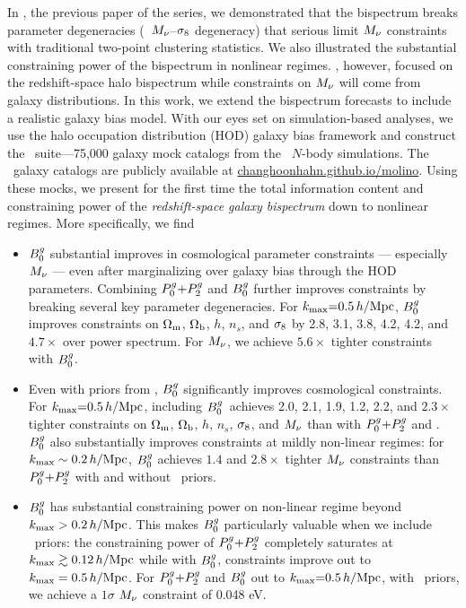 In \cite{hahn2020}, the previous paper of the series, we demonstrated that the 
bispectrum breaks parameter degeneracies (\eg~$M_\nu$--$\sigma_8$ degeneracy) that 
serious limit $M_\nu$ constraints with traditional two-point clustering statistics. 
We also illustrated the substantial constraining power of the bispectrum in nonlinear regimes.
\cite{hahn2020}, however, focused on the redshift-space halo bispectrum while 
constraints on $M_\nu$ will come from galaxy distributions. %
In this work, we extend the \cite{hahn2020} bispectrum forecasts to
include a realistic galaxy bias model. With our eyes set on
simulation-based analyses, we use the halo occupation distribution (HOD) galaxy
bias framework and construct the \molino~suite---75,000 galaxy mock catalogs from the \quij~$N$-body 
simulations. The \molino~galaxy catalogs are publicly available at 
\href{changhoonhahn.github.io/molino}{changhoonhahn.github.io/molino}.  
Using these mocks, we present for the first time the total information
content and constraining power of the {\em redshift-space galaxy bispectrum} 
down to nonlinear regimes. More specifically, we find
\begin{itemize}
    \item $B^g_0$ substantial improves in cosmological parameter constraints ---
        especially $M_\nu$ --- even after marginalizing over galaxy bias through
        the HOD parameters. Combining $P^g_0{+}P^g_2$ and $B^g_0$ further improves
        constraints by breaking several key parameter degeneracies. For 
        $k_{\rm max}{=}0.5\,h/\mathrm{Mpc}$, $B^g_0$ improves constraints on 
        $\Omega_{\rm m}$, $\Omega_{\rm b}$, $h$, $n_s$, and $\sigma_8$ by 2.8, 3.1, 3.8, 4.2, 4.2, and 
        $4.7{\times}$ over power spectrum. For $M_\nu$, we achieve $5.6\times$ 
        tighter constraints with $B^g_0$.

    \item Even with priors from \planck, $B^g_0$ significantly improves
        cosmological constraints. For $k_{\rm max}{=}0.5\,h/\mathrm{Mpc}$, including 
        $B^g_0$~achieves 2.0, 2.1, 1.9, 1.2, 2.2, and $2.3\times$ tighter
        constraints on $\Omega_{\rm m}$, $\Omega_{\rm b}$, $h$, $n_s$, $\sigma_8$, and $M_\nu$ than with $P^g_0{+}P^g_2$
        and \planck. $B^g_0$ also substantially improves constraints at mildly non-linear regimes:
        for $k_{\rm max}\sim0.2\,h/\mathrm{Mpc}$, $B^g_0$ achieves $1.4$ and $2.8\times$ tighter
        $M_\nu$ constraints than $P^g_0{+}P^g_2$ with and without \planck~priors. 

    \item $B^g_0$ has substantial constraining power on non-linear regime beyond
        $k_{\rm max} > 0.2\,h/\mathrm{Mpc}$. This makes $B^g_0$ particularly valuable when we include
        \planck~priors: the constraining power of $P^g_0{+}P^g_2$ completely saturates 
        at $k_{\rm max} \gtrsim 0.12\,h/\mathrm{Mpc}$ while with $B^g_0$, constraints improve out to 
        $k_{\rm max}=0.5\,h/\mathrm{Mpc}$. For $P^g_0{+}P^g_2$ and $B^g_0$ out to $k_{\rm max}{=}0.5\,h/\mathrm{Mpc}$, with
        \planck~priors, we achieve a $1\sigma$ $M_\nu$ constraint of 0.048 eV.
\end{itemize}


